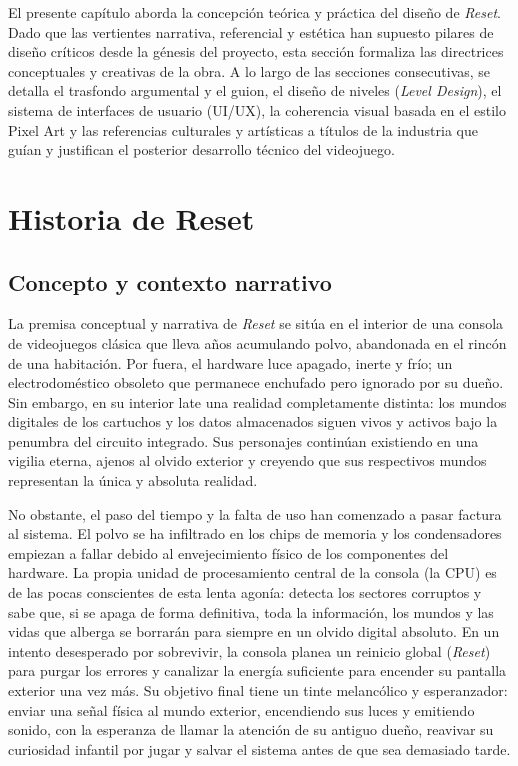 El presente capítulo aborda la concepción teórica y práctica del diseño de \textit{Reset}. Dado que las vertientes narrativa, referencial y estética han supuesto pilares de diseño críticos desde la génesis del proyecto, esta sección formaliza las directrices conceptuales y creativas de la obra. A lo largo de las secciones consecutivas, se detalla el trasfondo argumental y el guion, el diseño de niveles (\textit{Level Design}), el sistema de interfaces de usuario (UI/UX), la coherencia visual basada en el estilo Pixel Art y las referencias culturales y artísticas a títulos de la industria que guían y justifican el posterior desarrollo técnico del videojuego.

\section{Historia de Reset}
\subsection{Concepto y contexto narrativo}
\label{subsec:concepto}

La premisa conceptual y narrativa de \textit{Reset} se sitúa en el interior de una consola de videojuegos clásica que lleva años acumulando polvo, abandonada en el rincón de una habitación. Por fuera, el hardware luce apagado, inerte y frío; un electrodoméstico obsoleto que permanece enchufado pero ignorado por su dueño. Sin embargo, en su interior late una realidad completamente distinta: los mundos digitales de los cartuchos y los datos almacenados siguen vivos y activos bajo la penumbra del circuito integrado. Sus personajes continúan existiendo en una vigilia eterna, ajenos al olvido exterior y creyendo que sus respectivos mundos representan la única y absoluta realidad.

No obstante, el paso del tiempo y la falta de uso han comenzado a pasar factura al sistema. El polvo se ha infiltrado en los chips de memoria y los condensadores empiezan a fallar debido al envejecimiento físico de los componentes del hardware. La propia unidad de procesamiento central de la consola (la CPU) es de las pocas conscientes de esta lenta agonía: detecta los sectores corruptos y sabe que, si se apaga de forma definitiva, toda la información, los mundos y las vidas que alberga se borrarán para siempre en un olvido digital absoluto. En un intento desesperado por sobrevivir, la consola planea un reinicio global (\textit{Reset}) para purgar los errores y canalizar la energía suficiente para encender su pantalla exterior una vez más. Su objetivo final tiene un tinte melancólico y esperanzador: enviar una señal física al mundo exterior, encendiendo sus luces y emitiendo sonido, con la esperanza de llamar la atención de su antiguo dueño, reavivar su curiosidad infantil por jugar y salvar el sistema antes de que sea demasiado tarde.

